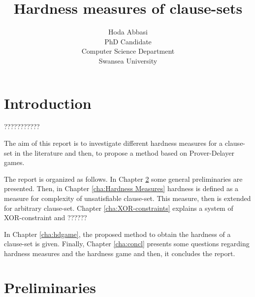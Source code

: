 \documentclass[]{book}
\begin{document}
\title{Hardness measures of clause-sets}

\author{Hoda Abbasi\\
             PhD Candidate\\
             Computer Science Department\\
             Swansea University\\}
\maketitle
\tableofcontents

\chapter{Introduction}
\label{cha:Introduction}

???????????

The aim of this report is to investigate different hardness measures for a clause-set in the literature and then, 
to propose a method based on Prover-Delayer games. 

The report is organized as follows. In Chapter \ref{cha:Preliminaries} some general preliminaries are presented.
Then, in Chapter \ref{cha:Hardness Measures} hardness is defined as a measure for complexity of unsatisfiable clause-set.
This measure, then is extended for arbitrary clause-set. 
Chapter \ref{cha:XOR-constraints} explains a system of XOR-constraint and ??????

In Chapter \ref{cha:hdgame}, the proposed method to obtain the hardness of a clause-set is given.
Finally, Chapter \ref{cha:concl} presents some questions regarding hardness measures and the hardness game and then, it concludes the report.
\chapter{Preliminaries}
\label{cha:Preliminaries}
\end{document}
